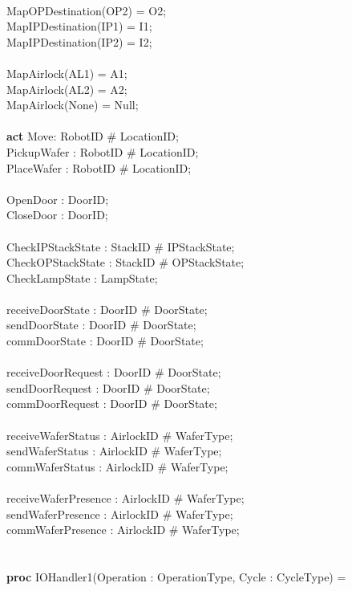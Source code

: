 \documentclass[a4paper,12pt]{article}
\begin{document}
	\\		MapOPDestination(OP2) = O2;
	\\		MapIPDestination(IP1) = I1;
	\\		MapIPDestination(IP2) = I2;
	\\
	\\		MapAirlock(AL1) = A1;
	\\		MapAirlock(AL2) = A2;
	\\		MapAirlock(None) = Null;
	\\
	\\\textbf{act} Move: RobotID \# LocationID;
	\\PickupWafer : RobotID \# LocationID;
	\\	PlaceWafer : RobotID \# LocationID;
	\\
	\\	    OpenDoor : DoorID;
	\\		CloseDoor : DoorID;
	\\
	\\	  CheckIPStackState : StackID \# IPStackState;
	\\	  CheckOPStackState : StackID \# OPStackState;
	\\		CheckLampState : LampState;
	\\
	\\	  receiveDoorState : DoorID \# DoorState;
	\\	  sendDoorState : DoorID \# DoorState;
	\\		commDoorState : DoorID \# DoorState;
	\\
	\\	  receiveDoorRequest : DoorID \# DoorState;
	\\		sendDoorRequest : DoorID \# DoorState;
	\\		commDoorRequest : DoorID \# DoorState;
	\\
	\\	  receiveWaferStatus : AirlockID \# WaferType;
	\\		sendWaferStatus : AirlockID \# WaferType;
	\\		commWaferStatus : AirlockID \# WaferType;
	\\
	\\	  receiveWaferPresence : AirlockID \# WaferType;
	\\		sendWaferPresence : AirlockID \# WaferType;
	\\		commWaferPresence : AirlockID \# WaferType;
	\\
	\\
	\\\textbf{proc} IOHandler1(Operation : OperationType, Cycle : CycleType) = 
\end{document}
